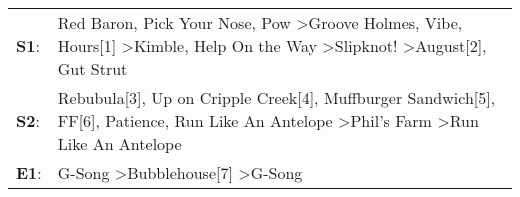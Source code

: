 \begin{supertabular}{p{0.03\textwidth}p{0.92\textwidth}}
 \textbf{S1}:  &  Red Baron\textsuperscript{}, \enspace Pick Your Nose\textsuperscript{}, \enspace Pow\textsuperscript{} \textgreater \enspace Groove Holmes\textsuperscript{}, \enspace Vibe\textsuperscript{}, \enspace Hours[1]\textsuperscript{} \textgreater \enspace Kimble\textsuperscript{}, \enspace Help On the Way\textsuperscript{} \textgreater \enspace Slipknot!\textsuperscript{} \textgreater \enspace August[2]\textsuperscript{}, \enspace Gut Strut\textsuperscript{}  \enspace  \\
 \textbf{S2}:  &                                                                                             Rebubula[3]\textsuperscript{}, \enspace Up on Cripple Creek[4]\textsuperscript{}, \enspace Muffburger Sandwich[5]\textsuperscript{}, \enspace FF[6]\textsuperscript{}, \enspace Patience\textsuperscript{}, \enspace Run Like An Antelope\textsuperscript{} \textgreater \enspace Phil's Farm\textsuperscript{} \textgreater \enspace Run Like An Antelope\textsuperscript{}  \enspace  \\
 \textbf{E1}:  &                                                                                                                                                                                                                                                                                                                                           G-Song\textsuperscript{} \textgreater \enspace Bubblehouse[7]\textsuperscript{} \textgreater \enspace G-Song\textsuperscript{}  \enspace  \\
\end{supertabular}
